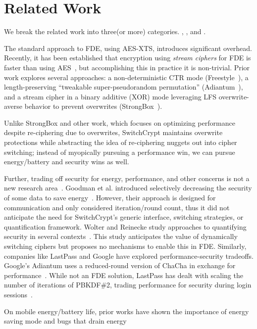 \section{Related Work} \label{sec:related}

We break the related work into three(or more\xxx) categories.
\xxx, \xxx, and \xxx.





The standard approach to FDE, using AES-XTS, introduces significant overhead.
Recently, it has been established that encryption using \emph{stream ciphers}
for FDE is faster than using AES~\cite{StrongBox}, but accomplishing this in
practice it is non-trivial. Prior work explores several approaches: a
non-deterministic CTR mode (Freestyle~\cite{Freestyle}), a length-preserving
``tweakable super-pseudorandom permutation'' (Adiantum~\cite{Adiantum}), and a
stream cipher in a binary additive (XOR) mode leveraging LFS overwrite-averse
behavior to prevent overwrites (StrongBox~\cite{StrongBox}).

Unlike StrongBox and other work, which focuses on optimizing performance despite
re-ciphering due to overwrites, SwitchCrypt maintains overwrite protections
while abstracting the idea of re-ciphering nuggets out into cipher switching;
instead of myopically pursuing a performance win, we can pursue energy/battery
and security wins as well.

Further, trading off security for energy, performance, and other concerns is not
a new research area~\cite{ScalableSecurity, WolterReinecke, ZengChow1,
HaleemEtAl, LiOmiecinski, Merkel4, Merkle3}. Goodman et al. introduced
selectively decreasing the security of some data to save
energy~\cite{ScalableSecurity}. However, their approach is designed for
communication and only considered iteration/round count, thus it did not
anticipate the need for SwitchCrypt's generic interface, switching strategies,
or quantification framework. Wolter and Reinecke study approaches to quantifying
security in several contexts~\cite{WolterReinecke}. This study anticipates the
value of dynamically switching ciphers but proposes no mechanisms to enable this
in FDE. Similarly, companies like LastPass and Google have explored
performance-security tradeoffs. Google's Adiantum uses a reduced-round version
of ChaCha in exchange for performance~\cite{Adiantum}. While not an FDE
solution, LastPass has dealt with scaling the number of iterations of PBKDF\#2,
trading performance for security during login sessions~\cite{LastPass}.


On mobile energy/battery life, prior works have shown the importance
of energy saving mode and bugs that drain energy \cite{yuan-yuan-zhou-work, ..}


